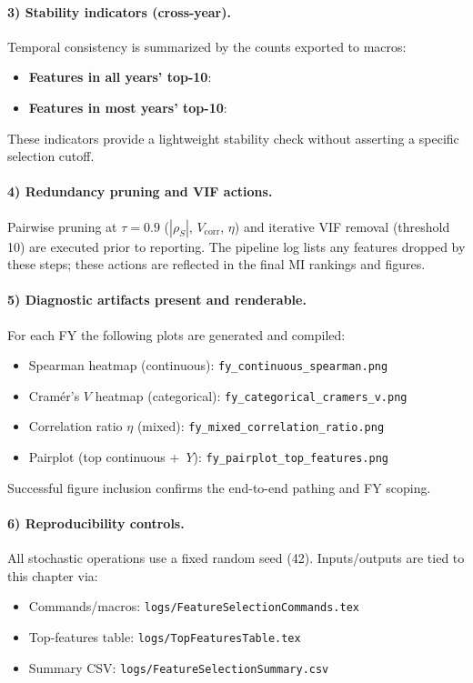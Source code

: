 \paragraph{3) Stability indicators (cross-year).}
Temporal consistency is summarized by the counts exported to macros:
\begin{itemize}
  \item \textbf{Features in all years' top-10}: \FSFeaturesAllYears
  \item \textbf{Features in most years' top-10}: \FSFeaturesMostYears
\end{itemize}
These indicators provide a lightweight stability check without asserting a specific selection cutoff.

\paragraph{4) Redundancy pruning and VIF actions.}
Pairwise pruning at \(\tau{=}0.9\) (\(|\rho_S|\), \(V_{\mathrm{corr}}\), \(\eta\)) and iterative VIF removal (threshold 10) are executed prior to reporting. The pipeline log lists any features dropped by these steps; these actions are reflected in the final MI rankings and figures.

\paragraph{5) Diagnostic artifacts present and renderable.}
For each FY the following plots are generated and compiled:
\begin{itemize}
  \item Spearman heatmap (continuous): \texttt{fy\FSExampleYear\_continuous\_spearman.png}
  \item Cramér's \(V\) heatmap (categorical): \texttt{fy\FSExampleYear\_categorical\_cramers\_v.png}
  \item Correlation ratio \(\eta\) (mixed): \texttt{fy\FSExampleYear\_mixed\_correlation\_ratio.png}
  \item Pairplot (top continuous + \(\,Y\)): \texttt{fy\FSExampleYear\_pairplot\_top\_features.png}
\end{itemize}
Successful figure inclusion confirms the end-to-end pathing and FY scoping.

\paragraph{6) Reproducibility controls.}
All stochastic operations use a fixed random seed (42). Inputs/outputs are tied to this chapter via:
\begin{itemize}
  \item Commands/macros: \texttt{logs/FeatureSelectionCommands.tex}
  \item Top-features table: \texttt{logs/TopFeaturesTable.tex}
  \item Summary CSV: \texttt{logs/FeatureSelectionSummary.csv}
\end{itemize}

